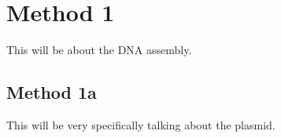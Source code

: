 \section{Method 1}
This will be about the DNA assembly.\\
\subsection{Method 1a}
This will be very specifically talking about the plasmid.
